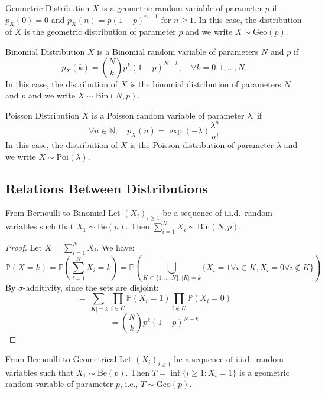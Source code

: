 \documentclass[11pt, a4paper]{article}
\begin{document}
\begin{definition}{Geometric Distribution}{}
$X$ is a geometric random variable of parameter $p$ if $p_X(0) = 0$ and $p_X(n) = p(1 - p)^{n-1}$ for $n \ge 1$. In this case, the distribution of $X$ is the geometric distribution of parameter $p$ and we write $X \sim \text{Geo}(p)$.
\end{definition}

\begin{definition}{Binomial Distribution}{}
$X$ is a Binomial random variable of parameters $N$ and $p$ if
\[ p_{X}(k) = \binom{N}{k}p^{k}(1-p)^{N-k}, \quad \forall k=0,1,\dots,N. \]
In this case, the distribution of $X$ is the binomial distribution of parameters $N$ and $p$ and we write $X \sim \text{Bin}(N,p)$.
\end{definition}

\begin{definition}{Poisson Distribution}{}
$X$ is a Poisson random variable of parameter $\lambda$, if
\[ \forall n \in \mathbb{N}, \quad p_{X}(n) = \exp(-\lambda)\frac{\lambda^{n}}{n!} \]
In this case, the distribution of $X$ is the Poisson distribution of parameter $\lambda$ and we write $X \sim \text{Poi}(\lambda)$.
\end{definition}

\subsection{Relations Between Distributions}

\begin{proposition}{From Bernoulli to Binomial}{}
Let $(X_i)_{i \ge 1}$ be a sequence of i.i.d.\ random variables such that $X_1 \sim \text{Be}(p)$. Then $\sum_{i=1}^N X_i \sim \text{Bin}(N, p)$.
\end{proposition}

\begin{proof}
Let $X = \sum_{i=1}^N X_i$. We have:
\[ \mathbb{P}(X=k) = \mathbb{P}\left(\sum_{i=1}^{N} X_i = k\right) = \mathbb{P}\left(\bigcup_{K \subset \{1, \dots, N\}, |K|=k} \{X_i=1 \forall i \in K, X_i=0 \forall i \notin K\}\right) \]
By $\sigma$-additivity, since the sets are disjoint:
\[ = \sum_{|K|=k} \prod_{i \in K} \mathbb{P}(X_i=1) \prod_{i \notin K} \mathbb{P}(X_i=0) \]
\[ = \binom{N}{k} p^k (1-p)^{N-k} \]
\end{proof}

\begin{proposition}{From Bernoulli to Geometrical}{}
Let $(X_i)_{i \ge 1}$ be a sequence of i.i.d.\ random variables such that $X_1 \sim \text{Be}(p)$. Then $T = \inf\{i \ge 1 : X_i = 1\}$ is a geometric random variable of parameter $p$, i.e., $T \sim \text{Geo}(p)$.
\end{proposition}
\end{document}
